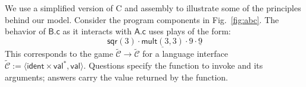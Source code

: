 \documentclass[acmsmall,screen,review,anonymous]{acmart}
\newcommand{\kw}[1]{\ensuremath{ \mathsf{#1} }}
\begin{document}
\begin{example} \label{ex:abc} %
We use a simplified version of C and assembly
to illustrate some of the principles behind our model.
Consider the program components in Fig.~\ref{fig:abc}.
The behavior of $\textsf{B.c}$
as it interacts with $\textsf{A.c}$
uses plays of the form:
\begin{equation} \label{eqn:cplay}
  \mathsf{sqr}(3) \cdot
    \underline{\mathsf{mult}(3,3)} \cdot 9 \cdot \underline{9}
\end{equation}
This corresponds to the game
$\tilde{\mathcal{C}} \rightarrow \tilde{\mathcal{C}}$
for a language interface
$\tilde{\mathcal{C}} :=
 \langle \kw{ident} \times \kw{val}^*, \kw{val} \rangle$.
Questions specify the function to invoke
and its arguments;
answers carry the value returned by the function.


\end{example}
\end{document}
